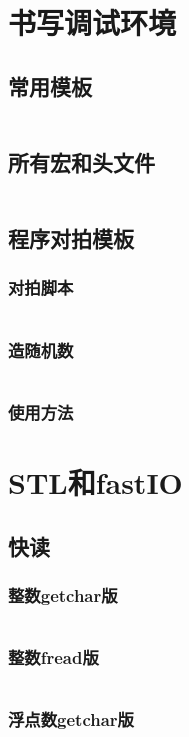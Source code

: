 \section{书写调试环境}
  \subsection{常用模板}
    \inputminted{cpp}{src/1_书写调试环境/1_常用模板.cpp}
  \subsection{所有宏和头文件}
    \inputminted{cpp}{src/1_书写调试环境/2_所有宏和头文件.cpp}
  \subsection{程序对拍模板}
    \subsubsection{对拍脚本}
      \inputminted{cpp}{src/1_书写调试环境/3_程序对拍模板/1_对拍脚本.cpp}
    \subsubsection{造随机数}
      \inputminted{cpp}{src/1_书写调试环境/3_程序对拍模板/2_造随机数.cpp}
    \subsubsection{使用方法}
      
\section{STL和fastIO}
  \subsection{快读}
    \subsubsection{整数getchar版}
      \inputminted{cpp}{src/2_STL和fastIO/1_快读/1_整数getchar版.cpp}
    \subsubsection{整数fread版}
      \inputminted{cpp}{src/2_STL和fastIO/1_快读/2_整数fread版.cpp}
    \subsubsection{浮点数getchar版}
      \inputminted{cpp}{src/2_STL和fastIO/1_快读/3_浮点数getchar版.cpp}
